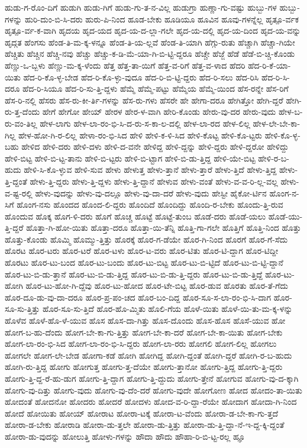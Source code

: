 {ಹುಡು-ಗ-ರೊಂ-ದಿಗೆ
ಹುಡುಗಿ
ಹುಡು-ಗಿಗೆ
ಹುಡು-ಗು-ತ-ನ-ವಿಲ್ಲ
ಹುಡುಗ್ರಾ
ಹುಣ್ಣಾ-ಗು-ವಷ್ಟು
ಹುಬ್ಬು-ಗಳ
ಹುಬ್ಬು-ಗಳನ್ನು
ಹುರಿ-ದುಂ-ಬಿ-ಸಿ-ದರು
ಹುರು-ಪಿ-ನಿಂದ
ಹೂಡ-ಬೇಕು
ಹೂಡಿಯೂ
ಹೂವಿನ
ಹೂವು-ಗಳನ್ನೆಲ್ಲ
ಹೃತ್ಪೂ-ರ್ವಕ
ಹೃತ್ಪೂ-ರ್ವ-ಕ-ವಾಗಿ
ಹೃದಯ
ಹೃದ-ಯದ
ಹೃದ-ಯ-ದ-ಲ್ಲಾ-ಗಲೇ
ಹೃದ-ಯ-ದಲ್ಲಿ
ಹೃದ-ಯ-ದಿಂದ
ಹೃದ-ಯ-ವನ್ನು
ಹೃದ್ಗತ
ಹೆಂಗಸು
ಹೆಂಡ-ತಿ-ಮ-ಕ್ಕ-ಳನ್ನೂ
ಹೆಂಡ-ತಿ-ಯ-ಲ್ಲವೆ
ಹೆಂಡ-ತಿ-ಯಾಗಿ
ಹೆಗ್ಗು-ರುತು
ಹೆಚ್ಚಾಗಿ
ಹೆಚ್ಚಾ-ಗಿಯೇ
ಹೆಚ್ಚಿತು
ಹೆಚ್ಚಿನ
ಹೆಚ್ಚಿ-ನವು
ಹೆಚ್ಚು
ಹೆಚ್ಚು-ಕ-ಡಿ-ಮೆ-ಯಾ-ಗಿ-ಬಿ-ಟ್ಟಿ-ದ್ದರೂ
ಹೆಚ್ಚೇ
ಹೆಜ್ಜೆ
ಹೆಡೆ
ಹೆಡೆ-ಬಿ-ಚ್ಚಿ-ಕೊಂಡು
ಹೆಣ್ಣು-ಒ-ಬ್ಬಳು
ಹೆಣ್ಣು-ಮ-ಕ್ಕ-ಳೆಂದು
ಹೆತ್ತ
ಹೆತ್ತ-ತಾ-ಯಿಗೆ
ಹೆತ್ತ-ವ-ರಿಗೆ
ಹೆತ್ತ-ವ-ಳಾದ
ಹೆದರಿ
ಹೆದ-ರಿ-ಕೆ-ಯಾ-ಯಿತು
ಹೆದ-ರಿ-ಕೊ-ಳ್ಳ-ಬೇಡ
ಹೆದ-ರಿ-ಕೊ-ಳ್ಳು-ವುದೂ
ಹೆದ-ರಿ-ಬಿ-ಟ್ಟಿ-ದ್ದರು
ಹೆದ-ರಿ-ಸಲು
ಹೆದ-ರಿಸಿ
ಹೆದ-ರಿ-ಸಿ-ದರೂ
ಹೆದ-ರಿ-ಸಿಯೂ
ಹೆದ-ರಿ-ಸು-ತ್ತಿ-ದ್ದಳು
ಹೆಮ್ಮೆ
ಹೆಮ್ಮೆ-ಪಟ್ಟು
ಹೆಮ್ಮೆಯ
ಹೆಮ್ಮೆ-ಯಿಂದ
ಹೆಸ-ರನ್ನೇ
ಹೆಸ-ರಿಗೆ
ಹೆಸ-ರಿ-ನಲ್ಲಿ
ಹೆಸರು
ಹೆಸ-ರು-ಕೀ-ರ್ತಿ-ಗಳನ್ನು
ಹೆಸ-ರು-ಗಳು
ಹೆಸರೇ
ಹೇ
ಹೇಗಾ-ದರೂ
ಹೇಗಿತ್ತೋ
ಹೇಗಿ-ದ್ದರೆ
ಹೇಗಿ-ರು-ತ್ತ-ದೆಂದು
ಹೇಗೆ
ಹೇಗೋ
ಹೇಯ್
ಹೇರಳ
ಹೇರ-ಳ-ವಾಗಿ
ಹೇರಿ-ಕೊಂಡು
ಹೇರು-ವು-ದರ
ಹೇರು-ವುದು
ಹೇಳ-ಬ-ರು-ವಂ-ತಿಲ್ಲ
ಹೇಳ-ಲಾಗು
ಹೇಳ-ಲಾ-ರಂ-ಭಿ-ಸಿ-ದ-ರು-ಸ-ಕಾ-ಲ-ದಲ್ಲಿ
ಹೇಳ-ಲಾ-ರದ
ಹೇಳ-ಲಿಲ್ಲ
ಹೇಳ-ಲೇ-ಬೇ-ಕಾ-ಗಿಲ್ಲ
ಹೇಳ-ಹೋ-ಗಿ-ರ-ಲಿಲ್ಲ
ಹೇಳಾ-ರಂ-ಭಿ-ಸಿದ
ಹೇಳಿ
ಹೇಳಿ-ಕ-ಳಿ-ಸಿದ
ಹೇಳಿ-ಕೊಟ್ಟ
ಹೇಳಿ-ಕೊ-ಟ್ಟರು
ಹೇಳಿ-ಕೊ-ಳ್ಳ-ಬಹು
ಹೇಳಿದ
ಹೇಳಿ-ದರು
ಹೇಳಿ-ದಳು
ಹೇಳಿ-ದ-ವನೇ
ಹೇಳಿದ್ದ
ಹೇಳಿ-ದ್ದನ್ನು
ಹೇಳಿ-ದ್ದರು
ಹೇಳಿ-ದ್ದರೋ
ಹೇಳಿದ್ದು
ಹೇಳಿ-ಬಿಟ್ಟ
ಹೇಳಿ-ಬಿ-ಟ್ಟ-ತಾನು
ಹೇಳಿ-ಬಿ-ಟ್ಟರು
ಹೇಳಿ-ಬಿ-ಟ್ಟಾಗ
ಹೇಳಿ-ಬಿ-ಡು-ತ್ತಿದ್ದ
ಹೇಳಿ-ಯೇ-ಬಿಟ್ಟ
ಹೇಳಿ-ರ-ಬ-ಹುದು
ಹೇಳಿ-ಸಿ-ಕೊ-ಳ್ಳುವ
ಹೇಳಿ-ಸುವ
ಹೇಳು
ಹೇಳುತ್ತ
ಹೇಳು-ತ್ತಾನೆ
ಹೇಳು-ತ್ತಾರೆ
ಹೇಳು-ತ್ತಿದೆ
ಹೇಳು-ತ್ತಿದ್ದ
ಹೇಳು-ತ್ತಿ-ದ್ದಂತೆ
ಹೇಳು-ತ್ತಿ-ದ್ದರು
ಹೇಳು-ತ್ತಿ-ದ್ದಳು
ಹೇಳು-ತ್ತಿ-ದ್ದಾನೆ
ಹೇಳುವ
ಹೇಳು-ವಂತೆ
ಹೇಳು-ವ-ವ-ರಿ-ಲ್ಲ-ವಲ್ಲ
ಹೇಳು-ವ-ಷ್ಟ-ರಲ್ಲಿ
ಹೇಳು-ವುದನ್ನು
ಹೇಳು-ವು-ದಲ್ಲೂ
ಹೇಳು-ವು-ದಾ-ದರೆ
ಹೇಳು-ವುದು
ಹೇಸ್ಟೀ
ಹೈಕೋ-ರ್ಟಿನ
ಹೊಂಗ-ನ-ಸಿಗೆ
ಹೊಂಗ-ನಸು
ಹೊಂದದ
ಹೊಂದ-ಲಿ-ದ್ದರು
ಹೊಂದಿದೆ
ಹೊಂದಿದ್ದು
ಹೊಂದಿ-ರ-ಬೇಕು
ಹೊಂದು-ತ್ತಿ-ರುವ
ಹೊಂದುವ
ಹೊಕ್ಕ
ಹೊಗ-ಳಿ-ದರು
ಹೊಗೆ
ಹೊಚ್ಚ
ಹೊಟ್ಟೆ
ಹೊಟ್ಟೆ-ತುಂಬ
ಹೊಡೆ-ದರು
ಹೊಡೆ-ಯಲು
ಹೊಡೆ-ಯು-ತ್ತಿ-ದ್ದರೆ
ಹೊತ್ತಾ-ಗಿ-ಹೋ-ಯಿತು
ಹೊತ್ತಾ-ದರೂ
ಹೊತ್ತಾ-ಯಿ-ತೆನ್ನಿ
ಹೊತ್ತಿ-ಗಾ-ಗಲೇ
ಹೊತ್ತಿಗೆ
ಹೊತ್ತಿ-ನಿಂದ
ಹೊತ್ತು
ಹೊತ್ತು-ಕೊಂಡು
ಹೊಮ್ಮಿ
ಹೊಮ್ಮು-ತ್ತಿತ್ತು
ಹೊರಕ್ಕೆ
ಹೊರ-ಗ-ಡೆಯೇ
ಹೊರ-ಗಿ-ನಿಂದ
ಹೊರಗೆ
ಹೊರ-ಗೆ-ಸೆದು
ಹೊರಟ
ಹೊರ-ಟರು
ಹೊರ-ಟರೆ
ಹೊರ-ಟಳು
ಹೊರ-ಟ-ವರು
ಹೊರ-ಟಿತು
ಹೊರ-ಟಿ-ದ್ದಾಗ
ಹೊರ-ಟಿದ್ದೀ
ಹೊರಟು
ಹೊರ-ಟು-ಬಂದ
ಹೊರ-ಟು-ಬಂದು
ಹೊರ-ಟು-ಬಿಟ್ಟ
ಹೊರ-ಟು-ಬಿ-ಟ್ಟಿದೆ
ಹೊರ-ಟು-ಬಿ-ಟ್ಟಿ-ದ್ದಾನೆ
ಹೊರ-ಟು-ಬಿ-ಡು-ತ್ತಾನೆ
ಹೊರ-ಟು-ಬಿ-ಡು-ತ್ತಿದ್ದ
ಹೊರ-ಟು-ಬಿ-ಡು-ತ್ತಿ-ದ್ದರು
ಹೊರ-ಟು-ಬಿ-ಡು-ತ್ತಿದ್ದೆ
ಹೊರ-ಟು-ಹೋಗಿ
ಹೊರ-ಟು-ಹೋ-ಗಿ-ದ್ದೆವು
ಹೊರ-ಟು-ಹೋದ
ಹೊರ-ಟೇ-ಬಿಟ್ಟ
ಹೊರ-ಡುವ
ಹೊರತು
ಹೊರ-ತೆ-ಗೆದು
ಹೊರ-ದೂ-ಡು-ವು-ದಾ-ದರೂ
ಹೊರ-ಪ್ರ-ಪಂ-ಚದ
ಹೊರ-ಬಂ-ದಿದ್ದ
ಹೊರ-ಸೂ-ಸ-ಲಾ-ರಂ-ಭಿ-ಸಿ-ದಾಗ
ಹೊರ-ಸೂ-ಸು-ತ್ತಿತ್ತು
ಹೊರ-ಸೂ-ಸು-ತ್ತಿದೆ
ಹೊರ-ಹೊ-ಮ್ಮಿತು
ಹೊಲಿ-ಗೆಯ
ಹೊಳೆ-ಯಿತು
ಹೊಳೆ-ಯಿ-ತು-ಮ-ಕ್ಕ-ಳನ್ನು
ಹೊಳೆವ
ಹೊಳೆ-ಹೊ-ಳೆ-ಯುವ
ಹೊಸ
ಹೊಸ-ದಾ-ಗಿತ್ತು
ಹೊಸ-ದೊಂದು
ಹೊಸ-ಹೊಸ
ಹೊಸೆ-ಯುವ
ಹೋ
ಹೋಗ-ಬ-ಹು-ದೆಂದು
ಹೋಗ-ಬೇ-ಕಾ-ಗು-ತ್ತಿತ್ತು
ಹೋಗ-ಬೇ-ಕಾ-ದರೆ
ಹೋಗ-ಬೇ-ಕಾ-ಯಿತು
ಹೋಗ-ಬೇಕು
ಹೋಗ-ಲಾ-ರಂ-ಭಿ-ಸಿದ
ಹೋಗ-ಲಾ-ರಂ-ಭಿ-ಸಿ-ದ್ದರು
ಹೋಗ-ಲಾ-ರರು
ಹೋಗಲಿ
ಹೋಗ-ಲಿಲ್ಲ
ಹೋಗಲು
ಹೋಗಲೇ
ಹೋಗ-ಲೇ-ಬೇಡ
ಹೋಗಾ-ಕಡೆ
ಹೋಗಿ
ಹೋಗಿದ್ದ
ಹೋಗಿ-ದ್ದಂತೆ
ಹೋಗಿ-ದ್ದರೆ
ಹೋಗಿ-ರ-ಬ-ಹುದು
ಹೋಗಿ-ರು-ತ್ತಿದ್ದ
ಹೋಗು
ಹೋಗುತ್ತ
ಹೋಗು-ತ್ತ-ದೆಯೇ
ಹೋಗು-ತ್ತಾನೋ
ಹೋಗು-ತ್ತಿದ್ದ
ಹೋಗು-ತ್ತಿ-ದ್ದರು
ಹೋಗು-ತ್ತಿ-ದ್ದ-ರೆ-ಹು-ಡುಗ
ಹೋಗು-ತ್ತಿ-ದ್ದಾಗ
ಹೋಗು-ತ್ತಿ-ದ್ದುದು
ಹೋಗು-ತ್ತೇನೆ
ಹೋಗುವ
ಹೋಗು-ವು-ದ-ಕ್ಕಾಗಿ
ಹೋಗು-ವು-ದಿತ್ತು
ಹೋಗು-ವುದು
ಹೋಗು-ವು-ದೆಂ-ದರೆ
ಹೋಗು-ವುದೇ
ಹೋಗೋಣ
ಹೋದ
ಹೋದಂ-ತಾ-ಯಿತು
ಹೋದಂತೆ
ಹೋದನೋ
ಹೋದರು
ಹೋದರೆ
ಹೋದಳು
ಹೋದ-ವ-ರಿ-ದ್ದಾ-ರೆಯೇ
ಹೋದಾಗ
ಹೋದಾ-ಗಿ-ನಿಂದ
ಹೋದೆ
ಹೋಯಿತು
ಹೋಯ್
ಹೋರಾಟ
ಹೋರಾ-ಟಕ್ಕೆ
ಹೋರಾ-ಟ-ವೆಂದು
ಹೋರಾ-ಡ-ಬೇ-ಕಾ-ಗು-ತ್ತದೆ
ಹೋರಾ-ಡ-ಬೇಕು
ಹೋರಾಡಿ
ಹೋರಾ-ಡು-ತ್ತಲೇ
ಹೋರಾ-ಡು-ತ್ತಿತ್ತು
ಹೋರಾ-ಡು-ತ್ತಿ-ದ್ದಾ-ನೆ-ಇ-ದ್ದ-ಕ್ಕಿ-ದ್ದಂತೆ
ಹೋರಾ-ಡು-ವುದನ್ನು
ಹೋಲುತ್ತಿ
ಹೋಳು-ಗಳನ್ನು
ಹೌದಾ
ಹೌದು
ಹೌಹಾ-ರಿ-ಬಿ-ಟ್ಟ-ರಲ್ಲ
ಹ್ಞೂ
}

